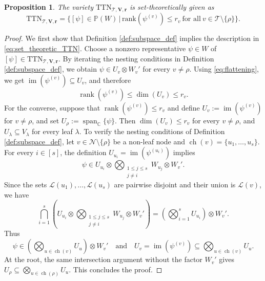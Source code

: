 \documentclass[12pt]{article}
\newtheorem{proposition}[theorem]{Proposition}
\theoremstyle{definition}
\numberwithin{theorem}{section}
\newcommand{\PP}{\mathbb{P}}
\newcommand{\rank}{\mathrm{rank}}
\begin{document}
\begin{proposition} \label{prop:TTN_set_theoretic}
    The variety $\mathrm{TTN}_{\mathscr T, \mathbf{V}, \mathbf{r}}$ is set-theoretically given as
    \begin{equation}\label{eq:set_theoretic_TTN}
        \mathrm{TTN}_{\mathscr T, \mathbf{V}, \mathbf{r}} = \{[\psi] \in \PP(W) \, | \, \rank(\psi^{(v)}) \leq r_v ~ \text{for all} ~ v \in \mathscr T \setminus \{\rho\}\}.
    \end{equation}
\end{proposition}
\begin{proof}
We first show that Definition \ref{def:subspace_def} implies the description in \eqref{eq:set_theoretic_TTN}. 
Choose a nonzero representative $\psi\in W$ of $[\psi]\in
\mathrm{TTN}_{\mathscr T,\mathbf V,\mathbf r}$. By iterating the
nesting conditions in Definition \ref{def:subspace_def}, we obtain $\psi\in U_v\otimes W_v'$ for every $v\neq\rho$. Using \eqref{eq:flattening}, we get $\operatorname{im}(\psi^{(v)})\subseteq U_v$,
and therefore
$$
\operatorname{rank}(\psi^{(v)})
\leq \dim(U_v)
\leq r_v.
$$
For the converse, suppose that $\operatorname{rank}(\psi^{(v)})\leq r_v$
and define $U_v:=\operatorname{im}(\psi^{(v)})$ for $v\neq\rho$,
and set $U_\rho:=\operatorname{span}_{\mathbb C}\{\psi\}$.
Then $\dim(U_v)\leq r_v$ for every $v\neq\rho$, and
$U_\lambda\subseteq V_\lambda$ for every leaf $\lambda$.
To verify the nesting conditions of Definition \ref{def:subspace_def}, let
$v\in\mathscr N \setminus \{\rho\}$ be a non-leaf node and 
$\operatorname{ch}(v)=\{u_1,\ldots,u_s\}$.
For every $i \in [s]$, the definition
$U_{u_i}=\operatorname{im}(\psi^{(u_i)})$ implies
\[
\psi\in
U_{u_i}
\otimes
\bigotimes_{\substack{1\leq j\leq s\\j\neq i}}W_{u_j}
\otimes W_v'.
\]
Since the sets $\mathscr L(u_1),\ldots,\mathscr L(u_s)$ are pairwise
disjoint and their union is $\mathscr L(v)$, we have
\begin{equation*}
\bigcap_{i=1}^s
\left(
U_{u_i}
\otimes
\bigotimes_{\substack{1\leq j\leq s\\j\neq i}}W_{u_j}
\otimes W_v'
\right) 
=
\left(\bigotimes_{i=1}^sU_{u_i}\right)\otimes W_v'.
\end{equation*}
Thus
\[
\psi\in
\left(\bigotimes_{u\in\operatorname{ch}(v)}U_u\right)
\otimes W_v' \quad \text{and} \quad U_v=\operatorname{im}(\psi^{(v)})
\subseteq
\bigotimes_{u\in\operatorname{ch}(v)}U_u.
\]
At the root, the same intersection argument without the factor
$W_v'$ gives
$U_\rho\subseteq
\bigotimes_{u\in\operatorname{ch}(\rho)}U_u$.
This concludes the proof.
\end{proof}
\end{document}
